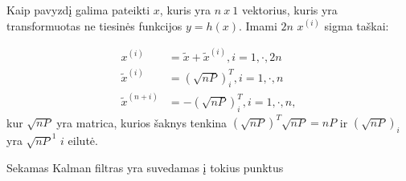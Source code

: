 Kaip pavyzdį galima pateikti $x$, kuris yra $n~x~1$ vektorius, kuris yra transformuotas ne tiesinės funkcijos $y = h(x)$.
Imami $2n$ $x^{(i)}$ sigma taškai:

\begin{equation}
    \begin{aligned}
    x^{(i)} &= \tilde{x} + \tilde{x}^{(i)}, i = 1, \cdot, 2n \\
    \tilde{x}^{(i)} &= (\sqrt{nP})^T_i, i = 1,\cdot,n\\
    \tilde{x}^{(n+i)} &= -(\sqrt{nP})^T_i, i = 1, \cdot, n,
    \end{aligned}
\end{equation}
kur $\sqrt{nP}$ yra matrica, kurios šaknys tenkina $(\sqrt{nP})^T\sqrt{nP} = nP$ ir $(\sqrt{nP})_i$ yra $\sqrt{nP}^1$ $i$ eilutė.

Sekamas Kalman filtras yra suvedamas į tokius punktus

